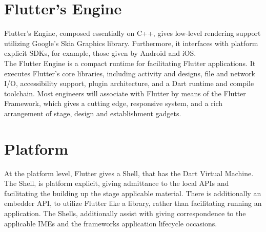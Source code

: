 \section{Flutter's Engine}
Flutter's Engine, composed essentially on C++, gives low-level rendering support utilizing Google's
Skia Graphics library. Furthermore, it interfaces with platform explicit SDKs, for example, those given
by Android and iOS.\\
The Flutter Engine is a compact runtime for facilitating Flutter applications. It executes Flutter's
core libraries, including activity and designs, file and network I/O, accessibility support, plugin architecture, and a Dart runtime and compile toolchain. Most engineers will associate with Flutter by means of
the Flutter Framework, which gives a cutting edge, responsive system, and a rich arrangement of stage,
design and establishment gadgets.

\section{Platform}
At the platform level, Flutter gives a Shell, that has the Dart Virtual Machine. The Shell, is platform
explicit, giving admittance to the local APIs and facilitating the building up the stage applicable
material. There is additionally an embedder API, to utilize Flutter like a library, rather than facilitating
running an application. The Shells, additionally assist with giving correspondence to the applicable IMEs and the frameworks
application lifecycle occasions.